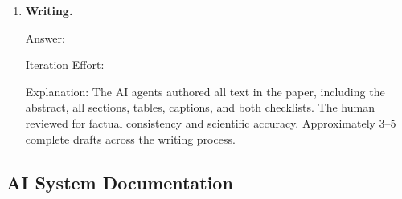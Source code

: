 \documentclass{article}
\begin{document}
\begin{enumerate}
Explanation: The AI agents ran all analysis scripts, computed all
statistics, generated all publication-quality figures, and interpreted
all results across three models. The human reviewed and validated the
final numbers against raw data files before submission.
Hundreds of analysis calls including multiple re-runs after
error correction and CKA implementation fix.

\item \textbf{Writing.}

Answer: \involvementD{}

Iteration Effort: \iterationMedium{}

Explanation: The AI agents authored all text in the paper, including
the abstract, all sections, tables, captions, and both checklists.
The human reviewed for factual consistency and scientific accuracy.
Approximately 3--5 complete drafts across the writing process.

\end{enumerate}

\subsection*{AI System Documentation}
\end{document}
